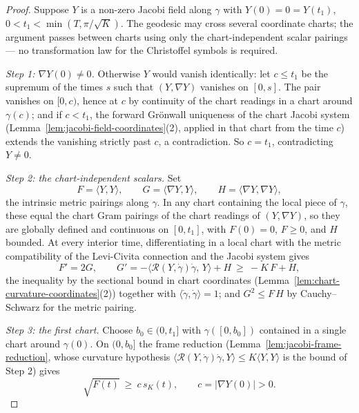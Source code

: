 \begin{proof}
\leanok
{}
Suppose $Y$ is a non-zero Jacobi field along $\gamma$ with
$Y(0)=0=Y(t_1)$, $0<t_1<\min(T,\pi/\sqrt K)$. The geodesic may cross
several coordinate charts; the argument passes between charts using
only the chart-independent scalar pairings — no transformation law for
the Christoffel symbols is required.

{\em Step 1: $\nabla Y(0)\not=0$.} Otherwise $Y$ would vanish
identically: let $c\le t_1$ be the supremum of the times $s$ such that
$(Y,\nabla Y)$ vanishes on $[0,s]$. The pair vanishes on $[0,c)$, hence
at $c$ by continuity of the chart readings in a chart around
$\gamma(c)$; and if $c<t_1$, the forward Gr\"onwall uniqueness of the
chart Jacobi system (Lemma~\ref{lem:jacobi-field-coordinates}(2),
applied in that chart from the time $c$) extends the vanishing strictly
past $c$, a contradiction. So $c=t_1$, contradicting $Y\not=0$.

{\em Step 2: the chart-independent scalars.} Set
$$F=\langle Y,Y\rangle,\qquad G=\langle\nabla Y,Y\rangle,\qquad
H=\langle\nabla Y,\nabla Y\rangle,$$
the intrinsic metric pairings along $\gamma$. In any chart containing
the local piece of $\gamma$, these equal the chart Gram pairings of the
chart readings of $(Y,\nabla Y)$, so they are globally defined and
continuous on $[0,t_1]$, with $F(0)=0$, $F\ge0$, and $H$ bounded. At
every interior time, differentiating in a local chart with the metric
compatibility of the Levi-Civita connection and the Jacobi system gives
$$F'=2G,\qquad
G'=-\langle{\mathcal R}(Y,\dot\gamma)\dot\gamma,\,Y\rangle+H
\ \ge\ -K\,F+H,$$
the inequality by the sectional bound in chart coordinates
(Lemma~\ref{lem:chart-curvature-coordinates}(2)) together with
$\langle\dot\gamma,\dot\gamma\rangle=1$; and $G^2\le F\,H$ by
Cauchy--Schwarz for the metric pairing.

{\em Step 3: the first chart.} Choose $b_0\in(0,t_1]$ with
$\gamma([0,b_0])$ contained in a single chart around $\gamma(0)$. On
$(0,b_0]$ the frame reduction (Lemma~\ref{lem:jacobi-frame-reduction},
whose curvature hypothesis
$\langle{\mathcal R}(Y,\dot\gamma)\dot\gamma,Y\rangle\le K\langle
Y,Y\rangle$ is the bound of Step 2) gives
$$\sqrt{F(t)}\ \ge\ c\,s_K(t),\qquad
c=|\nabla Y(0)|>0 .$$


\end{proof}
